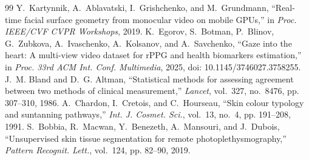 \documentclass[conference]{IEEEtran}
\begin{document}
\begin{thebibliography}{99}
 Y.~Kartynnik, A.~Ablavatski, I.~Grishchenko, and M.~Grundmann, ``Real-time facial surface geometry from monocular video on mobile GPUs,'' in \textit{Proc. IEEE/CVF CVPR Workshops}, 2019.
 K.~Egorov, S.~Botman, P.~Blinov, G.~Zubkova, A.~Ivaschenko, A.~Kolsanov, and A.~Savchenko, ``Gaze into the heart: A multi-view video dataset for rPPG and health biomarkers estimation,'' in \textit{Proc. 33rd ACM Int. Conf. Multimedia}, 2025, doi: 10.1145/3746027.3758255.
 J.~M. Bland and D.~G. Altman, ``Statistical methods for assessing agreement between two methods of clinical measurement,'' \textit{Lancet}, vol.~327, no.~8476, pp. 307--310, 1986.
 A.~Chardon, I.~Cretois, and C.~Hourseau, ``Skin colour typology and suntanning pathways,'' \textit{Int. J. Cosmet. Sci.}, vol.~13, no.~4, pp. 191--208, 1991.
 S.~Bobbia, R.~Macwan, Y.~Benezeth, A.~Mansouri, and J.~Dubois, ``Unsupervised skin tissue segmentation for remote photoplethysmography,'' \textit{Pattern Recognit. Lett.}, vol.~124, pp. 82--90, 2019.
\end{thebibliography}
\end{document}

